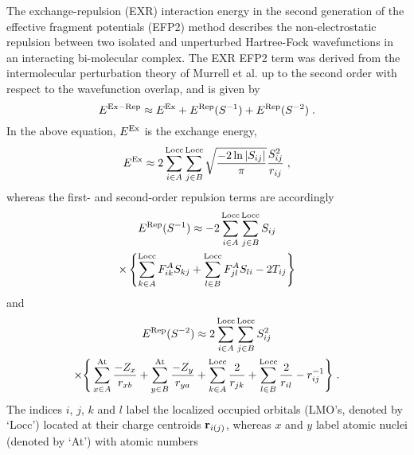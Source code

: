 The exchange\hyp{}repulsion (EXR) interaction energy in the
second generation of the
effective fragment potentials (EFP2) method\cite{Gordon.Smith.Xu.Slipchenko.AnnuRevPhysChem.2013,
   Nguyen.Pachter.Day.JCP.2014,
   Day.Jensen.Gordon.Webb.Stevens.Krauss.Garmer.Basch.Cohen.JCP.1996}
describes the non\hyp{}electrostatic repulsion
between two isolated and unperturbed Hartree\hyp{}Fock\cite{Roothaan.RevModPhys.1951} 
wavefunctions in an interacting
bi\hyp{}molecular complex.
The EXR EFP2 term was derived from the intermolecular perturbation theory
of Murrell et al.\cite{Murrell.Randic.Williams.Longuet-Higgins.ProcRSocLondA.1965,Otto.Ladik.ChemPhys.1975} 
up to the second order with respect to the wavefunction overlap,
and is given by~\cite{Jensen.JCP.1996,Jensen.Gordon.MolPhys.1996,Jensen.Gordon.JCP.1998}
%
\begin{equation} \label{e:exr-efp2}
 E^{\rm Ex-Rep} \approx
 E^{\rm Ex} +
 E^{\rm Rep}(S^{-1}) + 
 E^{\rm Rep}(S^{-2}) \;.
\end{equation}
%
In the above equation,
$E^{\rm Ex}$ is the exchange energy,\cite{Jensen.JCP.1996}
%
\begin{equation} \label{e:exc-efp2}
 E^{\rm Ex} \approx 2 \sum_{i\in A}^{\rm Locc} \sum_{j\in B}^{\rm Locc} 
 \sqrt{\frac{-2\ln{\vert S_{ij}\vert}}{\pi}} \frac{S^2_{ij}}{r_{ij}} \;,
\end{equation}
%
whereas the first\hyp{} and second\hyp{}order repulsion terms
are accordingly~\cite{Jensen.Gordon.MolPhys.1996,Jensen.Gordon.JCP.1998}
%
\begin{multline} \label{e:rep-efp2.s1}
 E^{\rm Rep}(S^{-1}) \approx - 2 \sum_{i\in A}^{\rm Locc} \sum_{j\in B}^{\rm Locc} S_{ij} \\
 \times
 \left\{
 \sum_{k\in A}^{\rm Locc} F_{ik}^A S_{kj} 
+\sum_{l\in B}^{\rm Locc} F_{jl}^A S_{li} 
 -2T_{ij}
 \right\}
\end{multline}
%
and 
%
\begin{multline} \label{e:rep-efp2.s2}
 E^{\rm Rep}(S^{-2}) \approx 2 \sum_{i\in A}^{\rm Locc} \sum_{j\in B}^{\rm Locc} S_{ij}^2 
 \\ \times 
 \Bigg\{
 \sum_{x\in A}^{\rm At}  \frac{-Z_x}{r_{xb}}
+\sum_{y\in B}^{\rm At}  \frac{-Z_y}{r_{ya}} 
+\sum_{k\in A}^{\rm Locc} \frac{   2}{r_{jk}}
+\sum_{l\in B}^{\rm Locc} \frac{   2}{r_{il}}
-r_{ij}^{-1}
 \Bigg\} \;.
\end{multline}
%
The indices $i$, $j$, $k$ and $l$ label the localized occupied orbitals (LMO's, denoted by `Locc')
located at their charge centroids ${\bf r}_{i(j)}$,
whereas $x$ and $y$ label atomic nuclei (denoted by `At') with atomic numbers 
